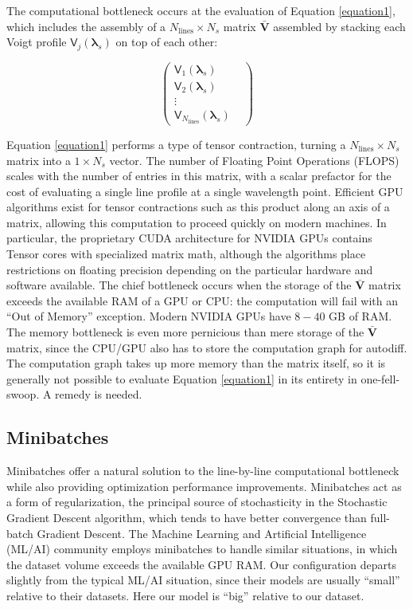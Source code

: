 \documentclass[modern]{aastex631}
\begin{document}
The computational bottleneck occurs at the evaluation of Equation \ref{equation1}, which includes the assembly of a $N_{\mathrm{lines}}\times N_{s}$ matrix $\bm{\bar{V}}$ assembled by stacking each Voigt profile $\mathsf{V}_j(\bm{\lambda}_s)$ on top of each other:

\begin{equation}
  \begin{pmatrix}
    \mathsf{V}_1(\bm{\lambda}_s)                    & \\
    \mathsf{V}_2(\bm{\lambda}_s)                    & \\
    \vdots                                          & \\
    \mathsf{V}_{N_{\mathrm{lines}}}(\bm{\lambda}_s) &
  \end{pmatrix}
\end{equation}

Equation \ref{equation1} performs a type of tensor contraction, turning a $N_{\mathrm{lines}}\times N_{s}$ matrix into a $1\times N_{s}$ vector.  The number of Floating Point Operations (FLOPS) scales with the number of entries in this matrix, with a scalar prefactor for the cost of evaluating a single line profile at a single wavelength point.  Efficient GPU algorithms exist for tensor contractions such as this product along an axis of a matrix, allowing this computation to proceed quickly on modern machines. In particular, the proprietary CUDA architecture for NVIDIA\textsuperscript{\tiny\textregistered} GPUs contains Tensor cores with specialized matrix math, although the algorithms place restrictions on floating precision depending on the particular hardware and software available.  The chief bottleneck occurs when the storage of the $\bm{\bar{V}}$ matrix exceeds the available RAM of a GPU or CPU: the computation will fail with an ``Out of Memory'' exception. Modern NVIDIA GPUs have $8-40$ GB of RAM.  The memory bottleneck is even more pernicious than mere storage of the $\bm{\bar{V}}$ matrix, since the CPU/GPU also has to store the computation graph for autodiff.  The computation graph takes up more memory than the matrix itself, so it is generally not possible to evaluate Equation \ref{equation1} in its entirety in one-fell-swoop.  A remedy is needed.

\subsection{Minibatches}

Minibatches offer a natural solution to the line-by-line computational bottleneck while also providing optimization performance improvements.  Minibatches act as a form of regularization, the principal source of stochasticity in the Stochastic Gradient Descent algorithm, which tends to have better convergence than full-batch Gradient Descent.  The Machine Learning and Artificial Intelligence (ML/AI) community employs minibatches to handle similar situations, in which the dataset volume exceeds the available GPU RAM.  Our configuration departs slightly from the typical ML/AI situation, since their models are usually ``small'' relative to their datasets.  Here our model is ``big'' relative to our dataset.
\end{document}
